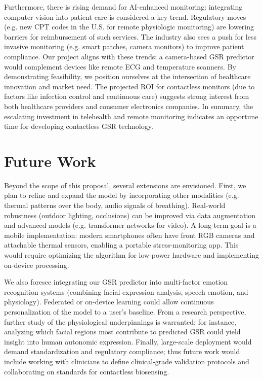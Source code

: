 \documentclass[12pt]{article}
\begin{document}
    Furthermore, there is rising demand for AI-enhanced monitoring: integrating computer vision into patient care is considered a key trend. Regulatory moves (e.g. new CPT codes in the U.S. for remote physiologic monitoring) are lowering barriers for reimbursement of such services. The industry also sees a push for less invasive monitoring (e.g. smart patches, camera monitors) to improve patient compliance. Our project aligns with these trends: a camera-based GSR predictor would complement devices like remote ECG and temperature scanners. By demonstrating feasibility, we position ourselves at the intersection of healthcare innovation and market need. The projected ROI for contactless monitors (due to factors like infection control and continuous care) suggests strong interest from both healthcare providers and consumer electronics companies. In summary, the escalating investment in telehealth and remote monitoring indicates an opportune time for developing contactless GSR technology.


    \section{Future Work}
    Beyond the scope of this proposal, several extensions are envisioned. First, we plan to refine and expand the model by incorporating other modalities (e.g. thermal patterns over the body, audio signals of breathing). Real-world robustness (outdoor lighting, occlusions) can be improved via data augmentation and advanced models (e.g. transformer networks for video). A long-term goal is a mobile implementation: modern smartphones often have front RGB cameras and attachable thermal sensors, enabling a portable stress-monitoring app. This would require optimizing the algorithm for low-power hardware and implementing on-device processing.

    We also foresee integrating our GSR predictor into multi-factor emotion recognition systems (combining facial expression analysis, speech emotion, and physiology). Federated or on-device learning could allow continuous personalization of the model to a user's baseline. From a research perspective, further study of the physiological underpinnings is warranted: for instance, analyzing which facial regions most contribute to predicted GSR could yield insight into human autonomic expression. Finally, large-scale deployment would demand standardization and regulatory compliance; thus future work would include working with clinicians to define clinical-grade validation protocols and collaborating on standards for contactless biosensing.
\end{document}
